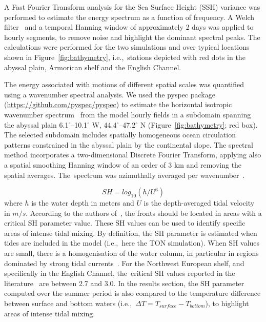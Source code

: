 \documentclass[jmse,article,accept,moreauthors,pdftex]{Definitions/mdpi}
\begin{document}
A Fast Fourier Transform analysis for the Sea Surface Height (SSH) variance was performed to estimate the energy spectrum as a function of frequency. A Welch filter~\cite{welch1967} and a temporal Hanning window of approximately 2 days was applied to hourly segments, to remove noise and highlight the dominant spectral peaks. The calculations were performed for the two simulations and over typical locations shown in Figure~\ref{fig:bathymetry}, i.e.,~stations depicted with red dots in the abyssal plain, Armorican shelf and the English Channel.

The energy associated with motions of different spatial scales was quantified using a wavenumber spectral analysis. We used the pyspec package (\url{https://github.com/pyspec/pyspec}) to estimate the horizontal isotropic wavenumber spectrum~\cite{Rocha2016} from the model hourly fields in a subdomain spanning the abyssal plain 6.1$^{\circ}${--}10.1$^{\circ}$ W, 44.4$^{\circ}${--}47.2$^{\circ}$ N (Figure~\ref{fig:bathymetry}; red box). The selected subdomain includes spatially homogeneous ocean circulation patterns constrained in the abyssal plain by the continental slope. The spectral method incorporates a two-dimensional Discrete Fourier Transform, applying also a spatial smoothing Hanning window of an order of 3 km and removing the spatial averages. The~spectrum was azimuthally averaged per wavenumber~\cite{Rocha2016}.

\begin{equation}
SH = log_{10}(h/U^3)
\label{eq:SH}
\end{equation}
where $h$ is the water depth in meters and $U$ is the depth-averaged tidal velocity in $m/s$. According to the authors of~\cite{simpson1974}, the fronts should be located in areas with a critical SH parameter value. These SH values can be used to identify specific areas of intense tidal mixing. By definition, the SH parameter is estimated when tides are included in the model (i.e.,~here the TON simulation). When SH values are small, there is a homogenisation of the water column, in particular in regions dominated by strong tidal currents~\cite{simpson1981}. For the Northwest European shelf, and specifically in the English Channel, the~critical SH values reported in the literature~\cite{bowerS1987,holt2008} are between 2.7 and 3.0. In the results section, the SH parameter computed over the summer period is also compared to the temperature difference between surface and bottom waters (i.e.,~$\Delta T=T_{surface}-T_{bottom}$), to highlight areas of intense tidal mixing.
\end{document}
